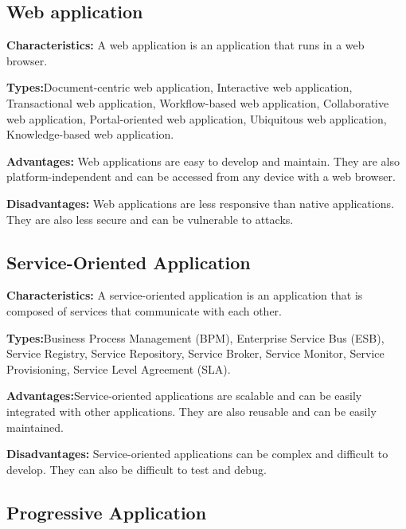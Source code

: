 \documentclass{article}
\begin{document}
		\subsection{Web application}
		
	\begin{flushleft}
		\textbf{Characteristics:} A web application is an application that runs in a web browser.
		
		\textbf{Types:}Document-centric web application, Interactive web application, Transactional web application, Workflow-based web application, Collaborative web application, Portal-oriented web application, Ubiquitous web application, Knowledge-based web application.
		
		\textbf{Advantages:}	Web applications are easy to develop and maintain. They are also platform-independent and can be accessed from any device with a web browser.
		
		\textbf{Disadvantages:}	Web applications are less responsive than native applications. They are also less secure and can be vulnerable to attacks.
	\end{flushleft}
	
		\subsection{Service-Oriented Application}
	
	\begin{flushleft}
		\textbf{Characteristics:} A service-oriented application is an application that is composed of services that communicate with each other.
		
		\textbf{Types:}Business Process Management (BPM), Enterprise Service Bus (ESB), Service Registry, Service Repository, Service Broker, Service Monitor, Service Provisioning, Service Level Agreement (SLA).
		
		\textbf{Advantages:}Service-oriented applications are scalable and can be easily integrated with other applications. They are also reusable and can be easily maintained.
		
		\textbf{Disadvantages:}	Service-oriented applications can be complex and difficult to develop. They can also be difficult to test and debug.
	\end{flushleft}
	
		\subsection{Progressive Application}
	
\end{document}
